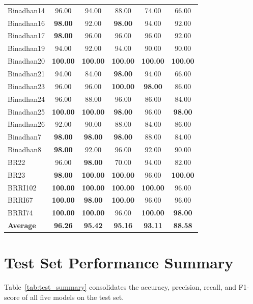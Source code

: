 \documentclass[11pt,a4paper]{article}
\begin{document}
\begin{table}[H]
\begin{tabular}{lccccc}
Binadhan14 & 96.00 & 94.00 & 88.00 & 74.00 & 66.00 \\
Binadhan16 & \textbf{98.00} & 92.00 & \textbf{98.00} & 94.00 & 92.00 \\
Binadhan17 & \textbf{98.00} & 96.00 & 96.00 & 96.00 & 92.00 \\
Binadhan19 & 94.00 & 92.00 & 94.00 & 90.00 & 90.00 \\
Binadhan20 & \textbf{100.00} & \textbf{100.00} & \textbf{100.00} & \textbf{100.00} & \textbf{100.00} \\
Binadhan21 & 94.00 & 84.00 & \textbf{98.00} & 94.00 & 66.00 \\
Binadhan23 & 96.00 & 96.00 & \textbf{100.00} & \textbf{98.00} & 86.00 \\
Binadhan24 & 96.00 & 88.00 & 96.00 & 86.00 & 84.00 \\
Binadhan25 & \textbf{100.00} & \textbf{100.00} & \textbf{98.00} & 96.00 & \textbf{98.00} \\
Binadhan26 & 92.00 & 90.00 & 88.00 & 84.00 & 86.00 \\
Binadhan7 & \textbf{98.00} & \textbf{98.00} & \textbf{98.00} & 88.00 & 84.00 \\
Binadhan8 & \textbf{98.00} & 92.00 & 96.00 & 92.00 & 90.00 \\
BR22 & 96.00 & \textbf{98.00} & 70.00 & 94.00 & 82.00 \\
BR23 & \textbf{98.00} & \textbf{100.00} & \textbf{100.00} & 96.00 & \textbf{100.00} \\
BRRI102 & \textbf{100.00} & \textbf{100.00} & \textbf{100.00} & \textbf{100.00} & 96.00 \\
BRRI67 & \textbf{100.00} & \textbf{98.00} & \textbf{100.00} & 96.00 & 96.00 \\
BRRI74 & \textbf{100.00} & \textbf{100.00} & 96.00 & \textbf{100.00} & \textbf{98.00} \\
\midrule
\textbf{Average} & \textbf{96.26} & \textbf{95.42} & \textbf{95.16} & \textbf{93.11} & \textbf{88.58} \\
\bottomrule
\end{tabular}
\end{table}

\section{Test Set Performance Summary}

Table~\ref{tab:test_summary} consolidates the accuracy, precision, recall, and F1-score of all five models on the test set.
\end{document}
